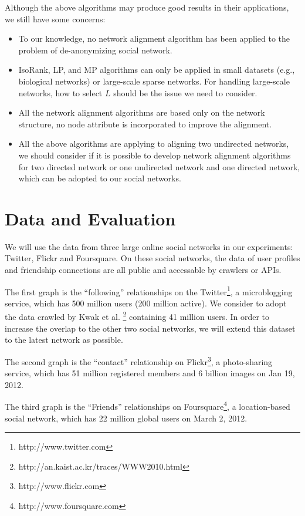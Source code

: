 \documentclass[11pt,letterpaper]{article}
\begin{document}
Although the above algorithms may produce good results in their applications, we still have some concerns:
\begin{itemize}
   \item
      To our knowledge, no network alignment algorithm has been applied to the problem of de-anonymizing social network.
   \item
      IsoRank, LP, and MP algorithms can only be applied in small datasets (e.g., biological networks) or large-scale sparse networks. For handling large-scale networks, how to select $L$ should be the issue we need to consider. 
   \item
      All the network alignment algorithms are based only on the network structure, no node attribute is incorporated to improve the alignment. 
   \item
      All the above algorithms are applying to aligning two undirected networks, we should consider if it is possible to develop network alignment algorithms for two directed network or one undirected network and one directed network, which can be adopted to our social networks. 
\end{itemize}

\section{Data and Evaluation}

We will use the data from three large online social networks in our experiments: Twitter, Flickr and Foursquare. On these social networks, the data of user profiles and friendship connections are all public and accessable by crawlers or APIs. 

The first graph is the ``following'' relationships on the Twitter\footnote{http://www.twitter.com}, a microblogging service, which has 500 million users (200 million active). We consider to adopt the data crawled by  Kwak et al. \footnote{http://an.kaist.ac.kr/traces/WWW2010.html} containing 41 million users. In order to increase the overlap to the other two social networks, we will extend this dataset to the latest network as possible. 

The second graph is the ``contact'' relationship on Flickr\footnote{http://www.flickr.com}, a photo-sharing service, which has 51 million registered members and 6 billion images on Jan 19, 2012.

The third graph is the ``Friends'' relationships on Foursquare\footnote{http://www.foursquare.com}, a location-based social network, which has 22 million global users on March 2, 2012. 
\end{document}
